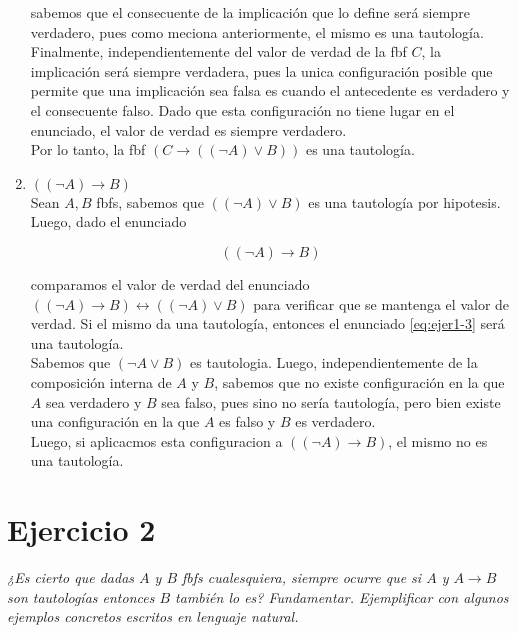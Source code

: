 \documentclass[osajnl,twocolumn,showpacs,superscriptaddress,10pt]{revtex4-1} %
\begin{document}
\begin{enumerate}[i-]
  sabemos que el consecuente de la implicación que lo define será siempre verdadero, pues como meciona anteriormente, el mismo es una tautología. Finalmente, independientemente del valor de verdad de la fbf $C$, la implicación será siempre verdadera, pues la unica configuración posible que permite que una implicación sea falsa es cuando el antecedente es verdadero y el consecuente falso. Dado que esta configuración no tiene lugar en el enunciado, el valor de verdad es siempre verdadero. \\

  Por lo tanto, la fbf $(C \rightarrow ((\neg A) \vee B))$ es una tautología. \\

  \item $((\neg A) \rightarrow B)$ \\

  Sean $A, B$ fbfs, sabemos que $((\neg A) \vee B)$ es una tautología por hipotesis. Luego, dado el enunciado

  \begin{equation}
    ((\neg A) \rightarrow B)
    \label{eq:ejer1-3}
  \end{equation}

  comparamos el valor de verdad del enunciado $((\neg A) \rightarrow B) \leftrightarrow ((\neg A) \vee B)$ para verificar que se mantenga el valor de verdad. Si el mismo da una tautología, entonces el enunciado \ref{eq:ejer1-3} será una tautología. \\

  Sabemos que $(\neg A \vee B)$ es tautologia. Luego, independientemente de la composición interna de $A$ y $B$, sabemos que no existe configuración en la que $A$ sea verdadero y $B$ sea falso, pues sino no sería tautología, pero bien existe una configuración en la que $A$ es falso y $B$ es verdadero. \\
  
  Luego, si aplicacmos esta configuracion a $((\neg A) \rightarrow B)$, el mismo no es una tautología. \\
\end{enumerate}

\section{Ejercicio 2}

\textit{¿Es cierto que dadas $A$ y $B$ fbfs cualesquiera, siempre ocurre que si $A$ y $A \rightarrow B$ son tautologías entonces $B$ también lo es? Fundamentar. Ejemplificar con algunos ejemplos concretos escritos en lenguaje natural.} \\
\end{document}
